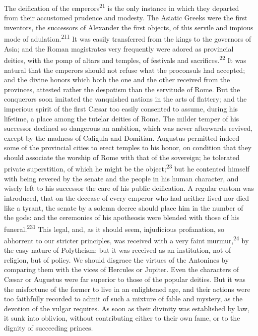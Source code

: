 The deification of the emperors\textsuperscript{21} is the only instance in which
they departed from their accustomed prudence and modesty. The
Asiatic Greeks were the first inventors, the successors of
Alexander the first objects, of this servile and impious mode of
adulation.\textsuperscript{211} It was easily transferred from the kings to the
governors of Asia; and the Roman magistrates very frequently were
adored as provincial deities, with the pomp of altars and
temples, of festivals and sacrifices.\textsuperscript{22} It was natural that the
emperors should not refuse what the proconsuls had accepted; and
the divine honors which both the one and the other received from
the provinces, attested rather the despotism than the servitude
of Rome. But the conquerors soon imitated the vanquished nations
in the arts of flattery; and the imperious spirit of the first
Cæsar too easily consented to assume, during his lifetime, a
place among the tutelar deities of Rome. The milder temper of his
successor declined so dangerous an ambition, which was never
afterwards revived, except by the madness of Caligula and
Domitian. Augustus permitted indeed some of the provincial cities
to erect temples to his honor, on condition that they should
associate the worship of Rome with that of the sovereign; he
tolerated private superstition, of which he might be the object;\textsuperscript{23}
but he contented himself with being revered by the senate and
the people in his human character, and wisely left to his
successor the care of his public deification. A regular custom
was introduced, that on the decease of every emperor who had
neither lived nor died like a tyrant, the senate by a solemn
decree should place him in the number of the gods: and the
ceremonies of his apotheosis were blended with those of his
funeral.\textsuperscript{231} This legal, and, as it should seem, injudicious
profanation, so abhorrent to our stricter principles, was
received with a very faint murmur,\textsuperscript{24} by the easy nature of
Polytheism; but it was received as an institution, not of
religion, but of policy. We should disgrace the virtues of the
Antonines by comparing them with the vices of Hercules or
Jupiter. Even the characters of Cæsar or Augustus were far
superior to those of the popular deities. But it was the
misfortune of the former to live in an enlightened age, and their
actions were too faithfully recorded to admit of such a mixture
of fable and mystery, as the devotion of the vulgar requires. As
soon as their divinity was established by law, it sunk into
oblivion, without contributing either to their own fame, or to
the dignity of succeeding princes.

